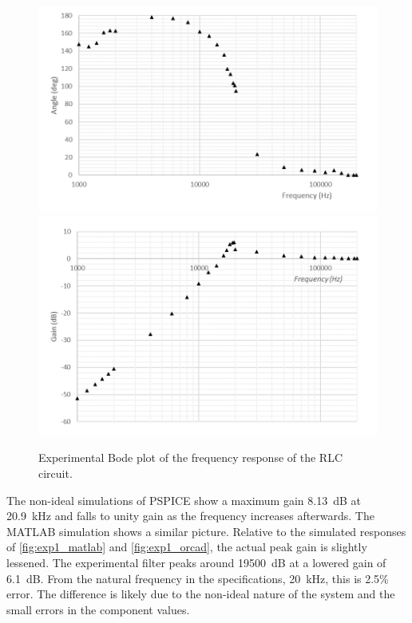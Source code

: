 \documentclass{report}
\begin{document}
\begin{figure}[h]
	\centering
	\includegraphics[width=0.5\linewidth]{exp1_freq_angle}\includegraphics[width=0.5\linewidth]{exp1_freq_angle1}
	\caption{Experimental Bode plot of the frequency response of the RLC circuit.}
	\label{fig:exp1bode}
\end{figure}

The non-ideal simulations of PSPICE show a maximum gain \SI{8.13}{\dB} at \SI{20.9}{\kHz} and falls to unity gain as the frequency increases afterwards. The MATLAB simulation shows a similar picture. Relative to the simulated responses of \ref{fig:exp1_matlab} and \ref{fig:exp1_orcad}, the actual peak gain is slightly lessened. The experimental filter peaks around \SI{19500}{\dB} at a lowered gain of \SI{6.1}{\dB}. From the natural frequency in the specifications, \SI{20}{\kHz}, this is 2.5\% error. The difference is likely due to the non-ideal nature of the system and the small errors in the component values.
\end{document}
